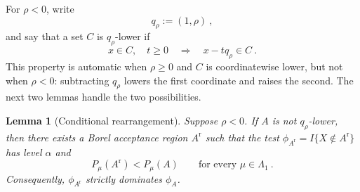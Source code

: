 \documentclass[12pt]{article}
\newtheorem{lemma}{Lemma}
\theoremstyle{remark}
\begin{document}
For $\rho<0$, write
\[
q_\rho:=(1,\rho)~,
\]
and say that a set $C$ is $q_\rho$-lower if
\[
x\in C,\quad t\ge0
\quad\Longrightarrow\quad
x-tq_\rho\in C~.
\]
This property is automatic when $\rho\ge0$ and $C$ is coordinatewise lower,
but not when $\rho<0$: subtracting $q_\rho$ lowers the first coordinate and
raises the second.  The next two lemmas handle the two possibilities.

\begin{lemma}[Conditional rearrangement]\label{lem:rearrangement}
Suppose $\rho<0$.  If $A$ is not $q_\rho$-lower, then there exists a Borel
acceptance region $A^{\mathrm r}$ such that the test
$\phi_{A^{\mathrm r}}=I\{X\notin A^{\mathrm r}\}$ has level $\alpha$ and
\[
P_\mu(A^{\mathrm r})<P_\mu(A)
\qquad\text{for every }\mu\in\Lambda_1~.
\]
Consequently, $\phi_{A^{\mathrm r}}$ strictly dominates $\phi_A$.
\end{lemma}
\end{document}
